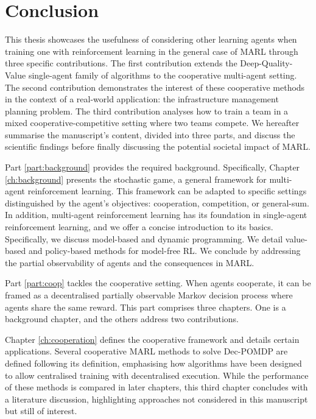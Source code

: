 \chapter{Conclusion}\label{ch:conclusion}

This thesis showcases the usefulness of considering other learning agents when training one with reinforcement learning in the general case of MARL through three specific contributions.
The first contribution extends the Deep-Quality-Value single-agent family of algorithms to the cooperative multi-agent setting.
The second contribution demonstrates the interest of these cooperative methods in the context of a real-world application: the infrastructure management planning problem.
The third contribution analyses how to train a team in a mixed cooperative-competitive setting where two teams compete.
We hereafter summarise the manuscript's content, divided into three parts, and discuss the scientific findings before finally discussing the potential societal impact of MARL.

Part \ref{part:background} provides the required background.
Specifically, Chapter \ref{ch:background} presents the stochastic game, a general framework for multi-agent reinforcement learning. 
This framework can be adapted to specific settings distinguished by the agent's objectives: cooperation, competition, or general-sum.
In addition, multi-agent reinforcement learning has its foundation in single-agent reinforcement learning, and we offer a concise introduction to its basics.
Specifically, we discuss model-based and dynamic programming.
We detail value-based and policy-based methods for model-free RL.
We conclude by addressing the partial observability of agents and the consequences in MARL.

Part \ref{part:coop} tackles the cooperative setting.
When agents cooperate, it can be framed as a decentralised partially observable Markov decision process where agents share the same reward.
This part comprises three chapters.
One is a background chapter, and the others address two contributions.

Chapter \ref{ch:cooperation} defines the cooperative framework and details certain applications.
Several cooperative MARL methods to solve Dec-POMDP are defined following its definition, emphasising how algorithms have been designed to allow centralised training with decentralised execution.
While the performance of these methods is compared in later chapters, this third chapter concludes with a literature discussion, highlighting approaches not considered in this manuscript but still of interest.

